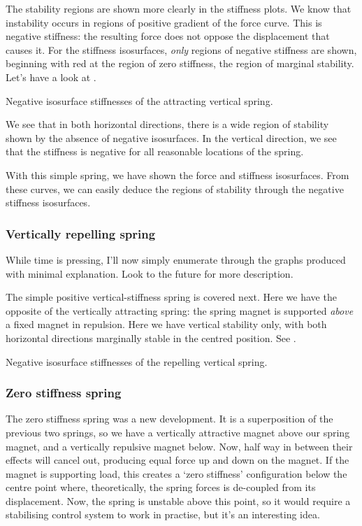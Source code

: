 \documentclass[11pt,a4paper]{memoir}
\begin{document}

The stability regions are shown more clearly in the stiffness plots. We know
that instability occurs in regions of positive gradient of the force curve.
This is negative stiffness: the resulting force does not oppose the
displacement that causes it. For the stiffness isosurfaces, \emph{only}
regions of negative stiffness are shown, beginning with red at the region of
zero stiffness, the region of marginal stability. Let's have a look at
.

  {Negative isosurface stiffnesses of the attracting vertical spring.}

We see that in both horizontal directions, there is a wide region of stability
shown by the absence of negative isosurfaces. In the vertical direction, we
see that the stiffness is negative for all reasonable locations of the spring.

With this simple spring, we have shown the force and stiffness isosurfaces.
From these curves, we can easily deduce the regions of stability through the
negative stiffness isosurfaces.

\subsubsection{Vertically repelling spring}

While time is pressing, I'll now simply enumerate through the graphs produced
with minimal explanation. Look to the future for more description.

The simple positive vertical-stiffness spring is covered next. Here we have
the opposite of the vertically attracting spring: the spring magnet is
supported \emph{above} a fixed magnet in repulsion. Here we have vertical
stability only, with both horizontal directions marginally stable in the
centred position. See .

  {Negative isosurface stiffnesses of the repelling vertical spring.}

\subsubsection{Zero stiffness spring}

The zero stiffness spring was a new development. It is a superposition of the
previous two springs, so we have a vertically attractive magnet above our
spring magnet, and a vertically repulsive magnet below. Now, half way in
between their effects will cancel out, producing equal force up and down on
the magnet. If the magnet is supporting load, this creates a `zero stiffness'
configuration below the centre point where, theoretically, the spring forces
is de-coupled from its displacement. Now, the spring is unstable above this
point, so it would require a stabilising control system to work in practise,
but it's an interesting idea.
\end{document}
